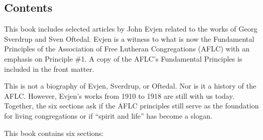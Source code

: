 
\subsection{Contents}

This book includes selected articles by John Evjen related to the works of Georg Sverdrup and Sven Oftedal. Evjen is a witness to what is now the Fundamental Principles of the Association of Free Lutheran Congregations (AFLC) with an emphasis on Principle \#1. A copy of the AFLC's Fundamental Principles is included in the front matter.

This is not a biography of Evjen, Sverdrup, or Oftedal. Nor is it a history of the AFLC. However, Evjen's works from 1910 to 1918 are still with us today. Together, the six sections ask if the AFLC principles still serve as the foundation for living congregations or if ``spirit and life'' has become a slogan.   

This book contains six sections:

